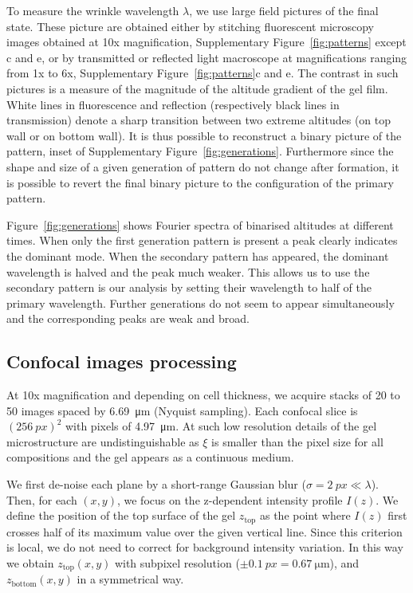 \documentclass[twocolumn,superscriptaddress,showpacs,preprintnumbers,
amsmath,amssymb,prl]{revtex4-1}
\begin{document}
To measure the wrinkle wavelength $\lambda$, we use large field pictures of the final state. These picture are obtained either by stitching fluorescent microscopy images obtained at 10x magnification, Supplementary Figure~\ref{fig:patterns} except c and e, or by transmitted or reflected light macroscope at magnifications ranging from 1x to 6x, Supplementary Figure~\ref{fig:patterns}c and e. The contrast in such pictures is a measure of the magnitude of the altitude gradient of the gel film. White lines in fluorescence and reflection (respectively black lines in transmission) denote a sharp transition between two extreme altitudes (on top wall or on bottom wall). It is thus possible to reconstruct a binary picture of the pattern, inset of Supplementary Figure~\ref{fig:generations}. Furthermore since the shape and size of a given generation of pattern do not change after formation, it is possible to revert the final binary picture to the configuration of the primary pattern.

Figure~\ref{fig:generations} shows Fourier spectra of binarised altitudes at different times. When only the first generation pattern is present a peak clearly indicates the dominant mode. When the secondary pattern has appeared, the dominant wavelength is halved and the peak much weaker. This allows us to use the secondary pattern is our analysis by setting their wavelength to half of the primary wavelength. Further generations do not seem to appear simultaneously and the corresponding peaks are weak and broad.

\subsection*{Confocal images processing}

At 10x magnification and depending on cell thickness, we acquire stacks of 20 to 50 images spaced by \SI{6.69}{\micro\metre} (Nyquist sampling). Each confocal slice is $(\SI{256}{px})^2$ with pixels of \SI{4.97}{\micro\metre}. At such low resolution details of the gel microstructure are undistinguishable as $\xi$ is smaller than the pixel size for all compositions and the gel appears as a continuous medium.

We first de-noise each plane by a short-range Gaussian blur ($\sigma=\SI{2}{px}\ll\lambda$). Then, for each $(x,y)$, we focus on the z-dependent intensity profile $I(z)$. We define the position of the top surface of the gel $z_\text{top}$ as the point where $I(z)$ first crosses half of its maximum value over the given vertical line. Since this criterion is local, we do not need to correct for background intensity variation. In this way we obtain $z_\text{top}(x,y)$ with subpixel resolution ($\pm\SI{0.1}{px}=\SI{0.67}{\micro\metre}$), and $z_\text{bottom}(x,y)$ in a symmetrical way.
\end{document}
